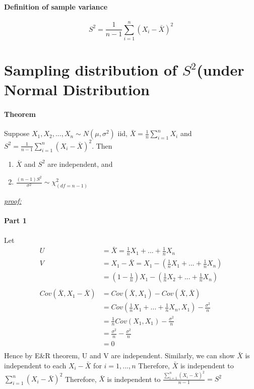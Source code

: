 \documentclass[11pt]{article}
\newcommand{\proof}[0]{\textit{\underline{proof: }}}
\begin{document}
\paragraph{Definition of sample variance}
$$S^2 = \frac{1}{n-1}\sum_{i=1}^n(X_i - \bar X)^2$$
\section{Sampling distribution of $S^2$(under Normal Distribution}
\paragraph{Theorem} Suppose $X_1, X_2,...,X_n \sim N(\mu,\sigma^2)$ iid,
$\bar X = \frac{1}{n}\sum_{i=1}^nX_i$ and $S^2 = \frac{1}{n-1}\sum_{i=1}^n(X_i - \bar X)^2$. \newline
Then 
\begin{enumerate}
	\item $\bar X$ and $S^2$ are independent, and 
	\item $\frac{(n-1)S^2}{\sigma^2} \sim \chi_{(df=n-1)}^2$
\end{enumerate}
\proof \newline
\paragraph{Part 1}
Let 
\begin{align*}
    U &= \bar X = \frac{1}{n}X_1 + ... +\frac{1}{n}X_n \\
	V &= X_1 - \bar X = X_1 - (\frac{1}{n}X_1 + ... +\frac{1}{n}X_n) \\
	&= (1 - \frac{1}{n})X_1 - (\frac{1}{n}X_2 + ... +\frac{1}{n}X_n) \\\\
	Cov(\bar X, X_1 - \bar X) &= Cov(\bar X, X_1) - Cov(\bar X, \bar X) \\
	&= Cov(\frac{1}{n}X_1 + ... +\frac{1}{n}X_n, X_1) - \frac{\sigma^2}{n}\\
	&= \frac{1}{n}Cov(X_1,X_1) -  \frac{\sigma^2}{n}\\
	&=  \frac{\sigma^2}{n} -  \frac{\sigma^2}{n}\\
	&= 0 \\
\end{align*}
Hence by E\&R theorem, U and V are independent.
Similarly, we can show $\bar X$ is independent to each $X_i - \bar X$ for $i = 1, ..., n$ \newline
Therefore, $\bar X$ is independent to  $\sum_{i=1}^n(X_i - \bar X)^2$ \newline
Therefore, $\bar X$ is independent to  $\frac{\sum_{i=1}^n(X_i - \bar X)^2}{n-1} = S^2$
\end{document}
